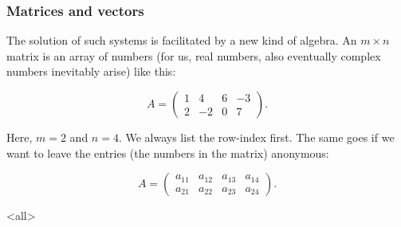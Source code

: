 \begin{frame}

\frametitle{Matrices and vectors}
\label{matricesandvectors}

The solution of such systems is facilitated by a new kind of algebra. An $ m \times n $ matrix is an array of numbers (for us, real numbers, also eventually complex numbers inevitably arise) like this:

\[
    A = \begin{pmatrix}
        1 & 4 & 6 & -3 \\
        2 & -2 & 0 & 7
    \end{pmatrix}.
\]

Here, $ m = 2 $ and $ n = 4 $. We always list the row-index first. The same goes if we want to leave the entries (the numbers in the matrix) anonymous:

\[
    A = \begin{pmatrix}
        a_{11} & a_{12} & a_{13} & a_{14} \\
        a_{21} & a_{22} & a_{23} & a_{24}
        \end{pmatrix}.
\]


\end{frame}

\mode<all>


\mode*

